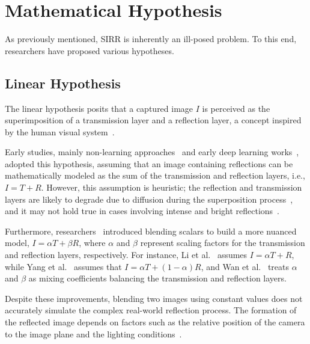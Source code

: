 \section{Mathematical Hypothesis}
\label{sec:hypothesis}
As previously mentioned, SIRR is inherently an ill-posed problem. To this end, researchers have proposed various hypotheses.

\subsection{Linear Hypothesis}
The linear hypothesis posits that a captured image $I$ is perceived as the superimposition of a transmission layer and a reflection layer, a concept inspired by the human visual system~\cite{levin2002learning}.

Early studies, mainly non-learning approaches~\cite{li2014single, levin2007user} and early deep learning works~\cite{zhang2018single, fan2017generic, hu2021trash}, adopted this hypothesis, assuming that an image containing reflections can be mathematically modeled as the sum of the transmission and reflection layers, i.e., $I = T + R$. However, this assumption is heuristic; the reflection and transmission layers are likely to degrade due to diffusion during the superposition process~\cite{hu2023single, wan2020reflection}, and it may not hold true in cases involving intense and bright reflections~\cite{li2023two}.

Furthermore, researchers~\cite{wan2018crrn, yang2018seeing, li2020single} introduced blending scalars to build a more nuanced model, $I = \alpha T + \beta R$, where $\alpha$ and $\beta$ represent scaling factors for the transmission and reflection layers, respectively. For instance, Li et al.~\cite{li2020single} assumes $I = \alpha T + R$, while Yang et al.~\cite{yang2018seeing} assumes that $I = \alpha T + (1-\alpha)R$, and Wan et al.~\cite{wan2018crrn} treats $\alpha$ and $\beta$ as mixing coefficients balancing the transmission and reflection layers. 

Despite these improvements, blending two images using constant values does not accurately simulate the complex real-world reflection process. The formation of the reflected image depends on factors such as the relative position of the camera to the image plane and the lighting conditions~\cite{wen2019single}.

